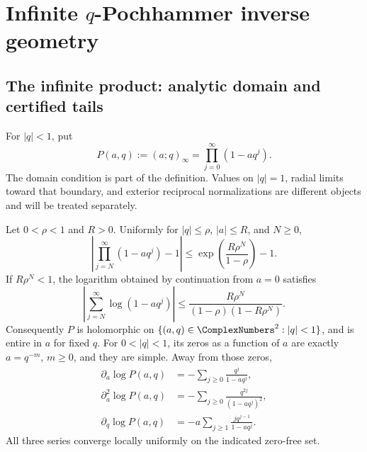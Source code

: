 \chapter{Infinite \texorpdfstring{\(q\)}{q}-Pochhammer inverse geometry}
\label{chap:infinite-q-pochhammer-inversion}

\section{The infinite product: analytic domain and certified tails}
\label{sec:ip-normal-convergence}
\label{sec:infinite-normal-convergence}

For \(|q|<1\), put
\[
 P(a,q):=(a;q)_\infty=\prod_{j=0}^{\infty}(1-aq^j).
\]
The domain condition is part of the definition.  Values on \(|q|=1\), radial
limits toward that boundary, and exterior reciprocal normalizations are
different objects and will be treated separately.

\begin{theorem}
\label{thm:ip-normal-convergence}
Let \(0<\rho<1\) and \(R>0\).  Uniformly for \(|q|\leq\rho\), \(|a|\leq R\),
and \(N\geq0\),
\begin{equation}
 \left|\prod_{j=N}^{\infty}(1-aq^j)-1\right|
 \leq \exp\left(\frac{R\rho^N}{1-\rho}\right)-1.
 \label{eq:ip-product-tail}
\end{equation}
If \(R\rho^N<1\), the logarithm obtained by continuation from \(a=0\)
satisfies
\begin{equation}
 \left|\sum_{j=N}^{\infty}\log(1-aq^j)\right|
 \leq
 \frac{R\rho^N}{(1-\rho)(1-R\rho^N)}.
 \label{eq:ip-log-tail}
\end{equation}
Consequently \(P\) is holomorphic on
\(\{(a,q)\in\ComplexNumbers^2:|q|<1\}\), and is entire in \(a\) for fixed \(q\).
For \(0<|q|<1\), its zeros as a function of \(a\) are exactly
\(a=q^{-m}\), \(m\geq0\), and they are simple.  Away from those zeros,
\begin{align}
 \partial_a\log P(a,q)
  &=-\sum_{j\geq0}\frac{q^j}{1-aq^j},
  \label{eq:ip-a-logder}\\
 \partial_a^2\log P(a,q)
  &=-\sum_{j\geq0}\frac{q^{2j}}{(1-aq^j)^2},
  \label{eq:ip-a-logsecond}\\
 \partial_q\log P(a,q)
  &=-a\sum_{j\geq1}\frac{j q^{j-1}}{1-aq^j}.
  \label{eq:ip-q-logder}
\end{align}
All three series converge locally uniformly on the indicated zero-free set.
\end{theorem}

